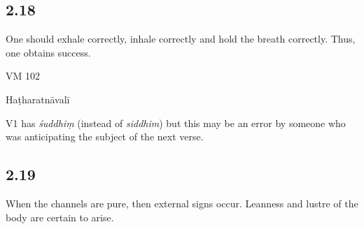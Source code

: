 \begin{ekdosis}
\begin{philcomm}[hp02_017]
\end{philcomm}


\subsection*{2.18}
\begin{translation}[hp02_018]
One should exhale correctly, inhale correctly and hold the breath correctly. Thus, one obtains success.
\end{translation}

\begin{sources}[hp02_018]
VM 102

\begin{versinnote}
\end{versinnote}
\end{sources}

\begin{testimonia}[hp02_018]
Haṭharatnāvalī

\begin{versinnote}
\end{versinnote}
\end{testimonia}

\begin{philcomm}[hp02_018]
V1 has \emph{śuddhiṃ} (instead of \emph{siddhim}) but this may be an error by someone who was anticipating the subject of the next verse.

\end{philcomm}

\subsection*{2.19}
\begin{translation}[hp02_019]
When the channels are pure, then external signs occur. Leanness and lustre of the body are certain to arise.
\end{translation}


\end{ekdosis}
